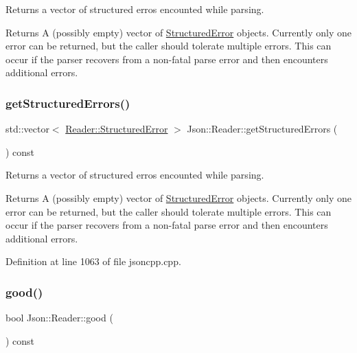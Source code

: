 Returns a vector of structured erros encounted while parsing. 

\begin{DoxyReturn}{Returns}
A (possibly empty) vector of \hyperlink{struct_json_1_1_reader_1_1_structured_error}{Structured\+Error} objects. Currently only one error can be returned, but the caller should tolerate multiple errors. This can occur if the parser recovers from a non-\/fatal parse error and then encounters additional errors. 
\end{DoxyReturn}
\hypertarget{class_json_1_1_reader_ae3d714e95bd98b27e296c607e408189b}{}\label{class_json_1_1_reader_ae3d714e95bd98b27e296c607e408189b} 
\subsubsection{\texorpdfstring{get\+Structured\+Errors()}{getStructuredErrors()}\hspace{0.1cm}{\footnotesize\ttfamily [2/2]}}
{\footnotesize\ttfamily std\+::vector$<$ \hyperlink{struct_json_1_1_reader_1_1_structured_error}{Reader\+::\+Structured\+Error} $>$ Json\+::\+Reader\+::get\+Structured\+Errors (\begin{DoxyParamCaption}{ }\end{DoxyParamCaption}) const}



Returns a vector of structured erros encounted while parsing. 

\begin{DoxyReturn}{Returns}
A (possibly empty) vector of \hyperlink{struct_json_1_1_reader_1_1_structured_error}{Structured\+Error} objects. Currently only one error can be returned, but the caller should tolerate multiple errors. This can occur if the parser recovers from a non-\/fatal parse error and then encounters additional errors. 
\end{DoxyReturn}


Definition at line 1063 of file jsoncpp.\+cpp.

\hypertarget{class_json_1_1_reader_a86cbb42b3e6d4a4d6416473b1a8f6ae7}{}\label{class_json_1_1_reader_a86cbb42b3e6d4a4d6416473b1a8f6ae7} 
\subsubsection{\texorpdfstring{good()}{good()}\hspace{0.1cm}{\footnotesize\ttfamily [1/2]}}
{\footnotesize\ttfamily bool Json\+::\+Reader\+::good (\begin{DoxyParamCaption}{ }\end{DoxyParamCaption}) const}



